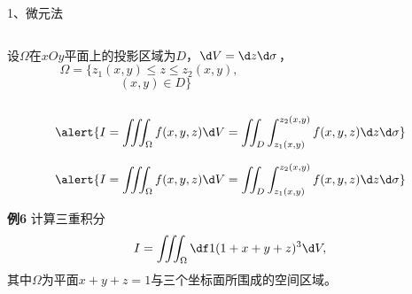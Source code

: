 \begin{frame}{1、微元法}
	\linespread{1.2}
	\begin{columns}
			设$\Omega$在$xOy$平面上的投影区域为$D$，\pause $\d V=\d z\d\sigma$，\pause 
			$$\Omega=\{z_1(x,y)\leq z\leq z_2(x,y),$$
			$$\quad (x,y)\in D\}$$
			\begin{center}
				\pause {}\pause 
			\end{center}
	\end{columns}
	$$\alert{I=\iiint_{\Omega}f(x,y,z)\d
	V=\iint_D\int_{z_1(x,y)}^{z_2(x,y)}f(x,y,z)\d z\d\sigma}$$
\end{frame}

\begin{frame}
	\linespread{1.2}
	$$\alert{I=\iiint_{\Omega}f(x,y,z)\d
	V=\iint_D\int_{z_1(x,y)}^{z_2(x,y)}f(x,y,z)\d z\d\sigma}$$
	\pause 
	\begin{exampleblock}{{\bf 例6}\hfill}
		计算三重积分
		$$I=\iiint_{\Omega}\df 1{(1+x+y+z)^3}\d V,$$
		其中$\Omega$为平面$x+y+z=1$与三个坐标面所围成的空间区域。
	\end{exampleblock}
\end{frame}


